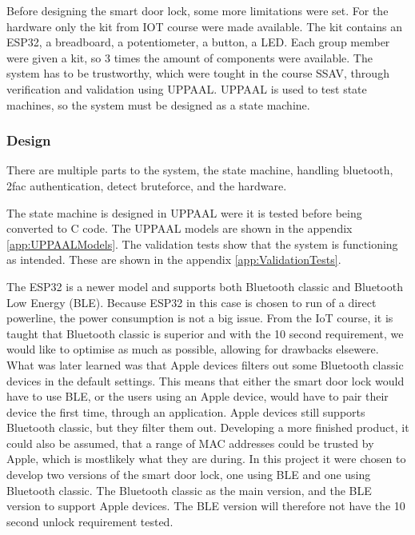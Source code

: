 
Before designing the smart door lock, some more limitations were set.
For the hardware only the kit from IOT course were made available.
The kit contains an ESP32, a breadboard, a potentiometer, a button, a LED.
Each group member were given a kit, so 3 times the amount of components were available.
The system has to be trustworthy, which were tought in the course SSAV, through verification and validation using UPPAAL.
UPPAAL is used to test state machines, so the system must be designed as a state machine.

\subsubsection{Design}

There are multiple parts to the system, the state machine, handling bluetooth, 2fac authentication, detect bruteforce, and the hardware.


The state machine is designed in UPPAAL were it is tested before being converted to C code.
The UPPAAL models are shown in the appendix \ref{app:UPPAALModels}.
The validation tests show that the system is functioning as intended.
These are shown in the appendix \ref{app:ValidationTests}.


The ESP32 is a newer model and supports both Bluetooth classic and Bluetooth Low Energy (BLE).
Because ESP32 in this case is chosen to run of a direct powerline, the power consumption is not a big issue.
From the IoT course, it is taught that Bluetooth classic is superior and with the 10 second requirement, we would like to optimise as much as possible, allowing for drawbacks elsewere.
What was later learned was that Apple devices filters out some Bluetooth classic devices in the default settings.
This means that either the smart door lock would have to use BLE, or the users using an Apple device, would have to pair their device the first time, through an application.
Apple devices still supports Bluetooth classic, but they filter them out.
Developing a more finished product, it could also be assumed, that a range of MAC addresses could be trusted by Apple, which is mostlikely what they are during.
In this project it were chosen to develop two versions of the smart door lock, one using BLE and one using Bluetooth classic.
The Bluetooth classic as the main version, and the BLE version to support Apple devices.
The BLE version will therefore not have the 10 second unlock requirement tested.

